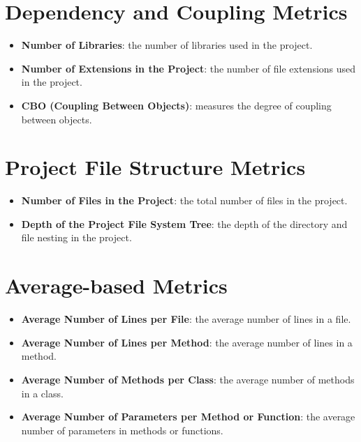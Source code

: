 \documentclass{article}
\begin{document}
\section{Dependency and Coupling Metrics}

\begin{itemize}
    \item \textbf{Number of Libraries}: the number of libraries used in the project.
    \item \textbf{Number of Extensions in the Project}: the number of file extensions used in the project.
    \item \textbf{CBO (Coupling Between Objects)}: measures the degree of coupling between objects.
\end{itemize}

\section{Project File Structure Metrics}

\begin{itemize}
    \item \textbf{Number of Files in the Project}: the total number of files in the project.
    \item \textbf{Depth of the Project File System Tree}: the depth of the directory and file nesting in the project.
\end{itemize}

\section{Average-based Metrics}

\begin{itemize}
    \item \textbf{Average Number of Lines per File}: the average number of lines in a file.
    \item \textbf{Average Number of Lines per Method}: the average number of lines in a method.
    \item \textbf{Average Number of Methods per Class}: the average number of methods in a class.
    \item \textbf{Average Number of Parameters per Method or Function}: the average number of parameters in methods or functions.
\end{itemize}
\end{document}

